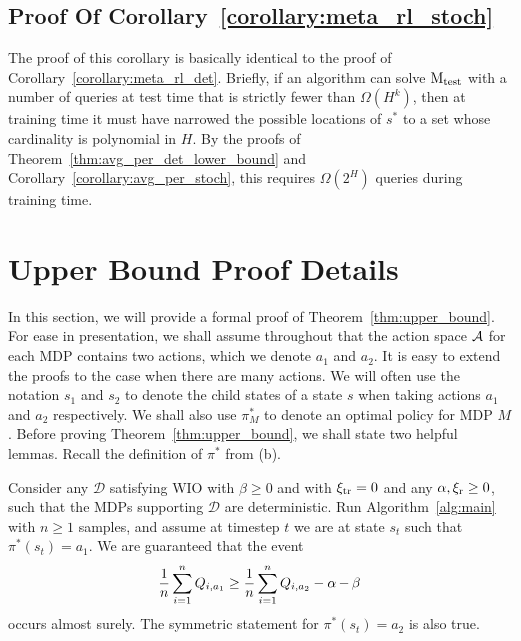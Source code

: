 \documentclass[11pt,twoside]{article}
\begin{document}
\subsection{Proof Of Corollary~\ref{corollary:meta_rl_stoch}}
\label{app:lower_corr_meta_stoch}
The proof of this corollary is basically identical to the proof of Corollary~\ref{corollary:meta_rl_det}. Briefly, if an algorithm can solve $\operatorname{M_{test}}$ with a number of queries at test time that is strictly fewer than $\Omega(H^k)$, then at training time it must have narrowed the possible locations of $s^*$ to a set whose cardinality is polynomial in $H$. By the proofs of Theorem~\ref{thm:avg_per_det_lower_bound} and Corollary~\ref{corollary:avg_per_stoch}, this requires $\Omega(2^H)$ queries during training time.





\section{Upper Bound Proof Details}
\label{app:upper}
In this section, we will provide a formal proof of Theorem~\ref{thm:upper_bound}. For ease in presentation, we shall assume throughout that the action space $\operatorname{\mathcal{A}}$ for each MDP contains two actions, which we denote $a_1$ and $a_2$. It is easy to extend the proofs to the case when there are many actions. We will often use the notation $s_1$ and $s_2$ to denote the child states of a state $s$ when taking actions $a_1$ and $a_2$ respectively. We shall also use $\pi^*_M$ to denote an optimal policy for MDP $M$. Before proving Theorem~\ref{thm:upper_bound}, we shall state two helpful lemmas. Recall the definition of $\pi^*$ from \strprox{} (b).

\begin{lemma}
\label{lemma:upper_bound_helper_one}
Consider any $\mathcal{D}$ satisfying WIO with $\beta \geq 0$ and \strprox{} with $\operatorname{\xi_{tr}} = 0$ and any $\operatorname{\alpha}, \operatorname{\xi_r} \geq 0$, such that the MDPs supporting $\mathcal{D}$ are deterministic. Run Algorithm~\ref{alg:main} with $n \geq 1$ samples, and assume at timestep $t$ we are at state $s_t$ such that $\pi^*(s_t) = a_1$. We are guaranteed that the event
$$
\frac{1}{n} \sum_{i=1}^n Q_{i,a_1} \geq \frac{1}{n} \sum_{i=1}^n Q_{i,a_2} - \operatorname{\alpha} - \operatorname{\beta}
$$
occurs almost surely. The symmetric statement for $\pi^*(s_t) = a_2$ is also true.
\end{lemma}
\end{document}
